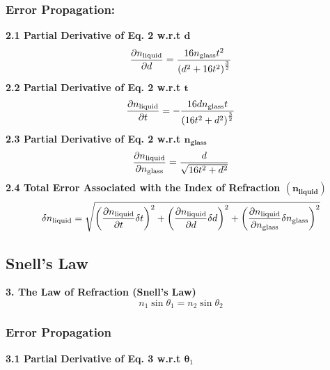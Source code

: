 \documentclass[12pt]{article}
\begin{document}
\subsubsection*{Error Propagation:}
    \noindent\textbf{2.1 Partial Derivative of Eq. 2 w.r.t $\bm d$}\[\frac{\partial n_{\textnormal{liquid}}}{\partial d}=\dfrac{16n_\textnormal{glass}t^2}{\left(d^2+16t^2\right)^\frac{3}{2}}\]
    \textbf{2.2 Partial Derivative of Eq. 2 w.r.t $\bm t$} \[\frac{\partial n_{\textnormal{liquid}}}{\partial t}=-\dfrac{16dn_\text{glass}t}{\left(16t^2+d^2\right)^\frac{3}{2}}\]
    \textbf{2.3 Partial Derivative of Eq. 2 w.r.t $\bm n_\textbf{glass}$}\[\frac{\partial n_{\textnormal{liquid}}}{\partial n_\text{glass}}=\dfrac{d}{\sqrt{16t^2+d^2}}\]
    \textbf{2.4 Total Error Associated with the Index of Refraction $\bm{({n_{\textbf{liquid}}})}$}\[\delta n_{\textnormal{liquid}} =\sqrt{\left(\frac{\partial n_{\textnormal{liquid}}}{\partial t}\delta t\right)^2+\left(\frac{\partial n_{\textnormal{liquid}}}{\partial d}\delta d\right)^2+\left(\frac{\partial n_{\textnormal{liquid}}}{\partial n_{\text{glass}}}\delta n_{\text{glass}}\right)^2}\]
\subsection*{Snell's Law}
\noindent\textbf{3. The Law of Refraction (Snell's Law)}\[n_1\sin{\theta_1}=n_2\sin{\theta_2}\]
\subsubsection*{Error Propagation}
\noindent\textbf{3.1 Partial Derivative of Eq. 3 w.r.t $\bm \theta_1$}
\end{document}
